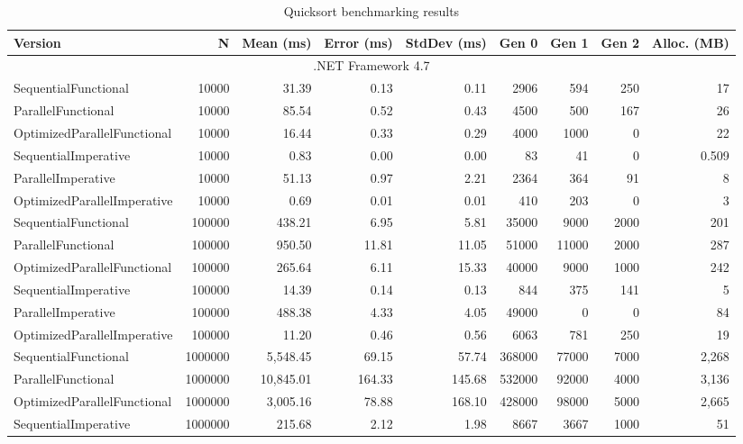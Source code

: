 \begin{table}
    \centering
    \caption{Quicksort benchmarking results}
		\label{tab: QuicksortBenchmarking}
    \begin{tabularx}{\linewidth}{Xrrrrrrrr} 
		  \toprule
			\toprule
			\bfseries Version 		&
			\bfseries N    	    	& 
			\bfseries Mean (ms) 	&
			\bfseries Error (ms)    &
			\bfseries StdDev (ms)	  &
			\bfseries Gen 0	    	&
			\bfseries Gen 1	    	&
			\bfseries Gen 2	    	&
			\bfseries Alloc. (MB) & \\ 
			\midrule 
			\multicolumn{9}{c}{.NET Framework 4.7} \\ 
			\midrule 
SequentialFunctional	&	10000	&	31.39	&	0.13	&	0.11	&	2906	&	594	&	250	&	17	\\
ParallelFunctional	&	10000	&	85.54	&	0.52	&	0.43	&	4500	&	500	&	167	&	26	\\
OptimizedParallelFunctional	&	10000	&	16.44	&	0.33	&	0.29	&	4000	&	1000	&	0	&	22	\\
SequentialImperative	&	10000	&	0.83	&	0.00	&	0.00	&	83	&	41	&	0	&	0.509	\\
ParallelImperative	&	10000	&	51.13	&	0.97	&	2.21	&	2364	&	364	&	91	&	8	\\
OptimizedParallelImperative	&	10000	&	0.69	&	0.01	&	0.01	&	410	&	203	&	0	&	3	\\
SequentialFunctional	&	100000	&	438.21	&	6.95	&	5.81	&	35000	&	9000	&	2000	&	201	\\
ParallelFunctional	&	100000	&	950.50	&	11.81	&	11.05	&	51000	&	11000	&	2000	&	287	\\
OptimizedParallelFunctional	&	100000	&	265.64	&	6.11	&	15.33	&	40000	&	9000	&	1000	&	242	\\
SequentialImperative	&	100000	&	14.39	&	0.14	&	0.13	&	844	&	375	&	141	&	5	\\
ParallelImperative	&	100000	&	488.38	&	4.33	&	4.05	&	49000	&	0	&	0	&	84	\\
OptimizedParallelImperative	&	100000	&	11.20	&	0.46	&	0.56	&	6063	&	781	&	250	&	19	\\
SequentialFunctional	&	1000000	&	5,548.45	&	69.15	&	57.74	&	368000	&	77000	&	7000	&	2,268	\\
ParallelFunctional	&	1000000	&	10,845.01	&	164.33	&	145.68	&	532000	&	92000	&	4000	&	3,136	\\
OptimizedParallelFunctional	&	1000000	&	3,005.16	&	78.88	&	168.10	&	428000	&	98000	&	5000	&	2,665	\\
SequentialImperative	&	1000000	&	215.68	&	2.12	&	1.98	&	8667	&	3667	&	1000	&	51	\\

\end{tabularx}
\end{table}
